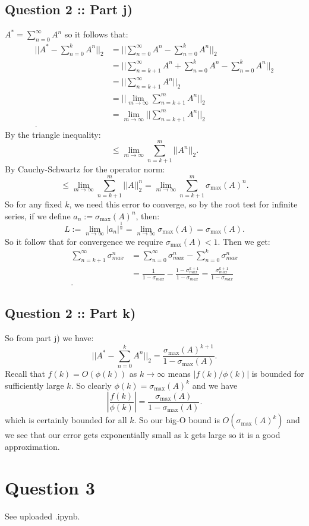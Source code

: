 \documentclass[a4paper]{article}
\begin{document}
\subsection*{Question 2 :: Part j)}
$A^* = \sum_{n=0}^{\infty} A^n$ so it follows that:
\begin{align*}
    ||A^* - \sum_{n=0}^{k} A^n||_2 &=  ||\sum_{n=0}^{\infty} A^n - \sum_{n=0}^{k} A^n||_2\\ 
 &=  ||\sum_{n=k+1}^{\infty} A^n + \sum_{n=0}^{k} A^n - \sum_{n=0}^{k} A^n||_2\\ 
 &=  ||\sum_{n=k+1}^{\infty} A^n||_2\\ 
 &=  ||\lim_{m \to \infty} \sum_{n=k+1}^{m} A^n||_2\\ 
 &=  \lim_{m \to \infty} ||\sum_{n=k+1}^{m} A^n||_2\\ 
.
\end{align*}
By the triangle inequality:
\[
\le \lim_{m \to \infty} \sum_{n=k+1}^{m} ||A^n||_2
.\]
By Cauchy-Schwartz for the operator norm:
\[
\le \lim_{m \to \infty} \sum_{n=k+1}^{m} ||A||_2^n = \lim_{m \to \infty} \sum_{n=k+1}^{m} \sigma_{\text{max}}(A)^n
.\]
So for any fixed $k$, we need this error to converge, so by the root test for infinite
series, if we define $a_n := \sigma_{\text{max}}(A)^n$,
then:
\[
L := \lim_{n \to \infty} \left| a_n \right|^{\frac{1}{n}} = \lim_{n \to \infty} \sigma_{\text{max}}(A) = \sigma_{\text{max}}(A)
.\]
So it follow that for convergence we require $\sigma_{\text{max}}(A) < 1$.
Then we get:
\begin{align*}
     \sum_{n=k+1}^{\infty} \sigma_{	{max}}^n &=  \sum_{n=0}^{\infty} \sigma_{	{max}}^{n} - \sum_{n=0}^{k} \sigma_{	{max}}^{n}\\ 
 &=  \frac{1}{1-\sigma_{	{max}}} - \frac{1 - \sigma_{	{max}}^{k+1}}{1 - \sigma_{	{max}}} =  \frac{\sigma_{	{max}}^{k+1}}{1 - \sigma_{	{max}}}\\ 
.
\end{align*}


\subsection*{Question 2 :: Part k)}
So from part j) we have:
\[
    ||A^* - \sum_{n=0}^{k} A^n||_2 = \frac{\sigma_{\text{max}}(A)^{k+1}}{1- \sigma_{\text{max}}(A)}
.\]
Recall that $f(k) = O(\phi(k))$ as $k\to \infty$ means $\left| f(k) / \phi(k) \right| $ is bounded
for sufficiently large $k$. So clearly  $\phi(k) = \sigma_{\text{max}}(A)^k$ and we have
\[
\left| \frac{f(k)}{\phi(k)} \right|  = \frac{\sigma_{\text{max}}(A)}{1 - \sigma_{\text{max}}(A)}
.\]
which is certainly bounded for all $k$.
So our big-O bound is  $O(\sigma_{\text{max}}(A)^{k})$ and we see
that our error gets exponentially small as k gets large so it is a good approximation.

\section*{Question 3}
See uploaded .ipynb.
\end{document}
